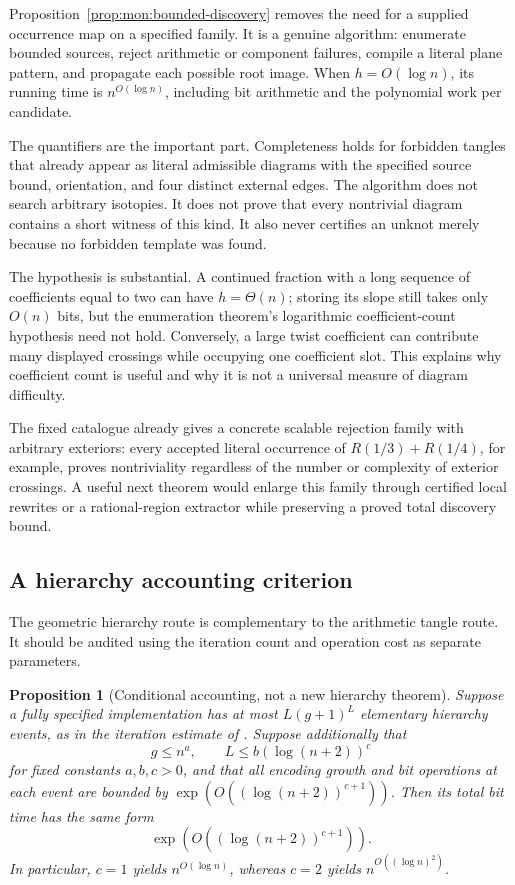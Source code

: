 \documentclass[11pt,a4paper]{article}
\newtheorem{proposition}[theorem]{Proposition}
\theoremstyle{definition}
\theoremstyle{remark}
\numberwithin{equation}{section}
\begin{document}
Proposition~\ref{prop:mon:bounded-discovery} removes the need for a
supplied occurrence map on a specified family. It is a genuine algorithm:
enumerate bounded sources, reject arithmetic or component failures,
compile a literal plane pattern, and propagate each possible root image.
When \(h=O(\log n)\), its running time is \(n^{O(\log n)}\), including
bit arithmetic and the polynomial work per candidate.

The quantifiers are the important part. Completeness holds for forbidden
tangles that already appear as literal admissible diagrams with the
specified source bound, orientation, and four distinct external edges.
The algorithm does not search arbitrary isotopies. It does not prove
that every nontrivial diagram contains a short witness of this kind.
It also never certifies an unknot merely because no forbidden template
was found.

The hypothesis is substantial. A continued fraction with a long sequence
of coefficients equal to two can have \(h=\Theta(n)\); storing its slope
still takes only \(O(n)\) bits, but the enumeration theorem's logarithmic
coefficient-count hypothesis need not hold. Conversely, a large twist
coefficient can contribute many displayed crossings while occupying one
coefficient slot. This explains why coefficient count is useful and why
it is not a universal measure of diagram difficulty.

The fixed catalogue already gives a concrete scalable rejection family
with arbitrary exteriors: every accepted literal occurrence of
\(R(1/3)+R(1/4)\), for example, proves nontriviality regardless of the
number or complexity of exterior crossings. A useful next theorem would
enlarge this family through certified local rewrites or a rational-region
extractor while preserving a proved total discovery bound.

\subsection{A hierarchy accounting criterion}

The geometric hierarchy route is complementary to the arithmetic tangle
route. It should be audited using the iteration count and operation cost
as separate parameters.

\begin{proposition}[Conditional accounting, not a new hierarchy theorem]
\label{prop:hierarchy-accounting}
Suppose a fully specified implementation has at most \(L(g+1)^L\)
elementary hierarchy events, as in the iteration estimate of
\cite[Proposition~9.1]{lackenby-2026}. Suppose additionally that
\[
 g\le n^a,\qquad L\le b(\log(n+2))^c
\]
for fixed constants \(a,b,c>0\), and that all encoding growth and
bit operations at each event are bounded by
\(\exp(O((\log(n+2))^{c+1}))\).
Then its total bit time has the same form
\[
 \exp(O((\log(n+2))^{c+1})).
\]
In particular, \(c=1\) yields \(n^{O(\log n)}\), whereas \(c=2\)
yields \(n^{O((\log n)^2)}\).
\end{proposition}
\end{document}
